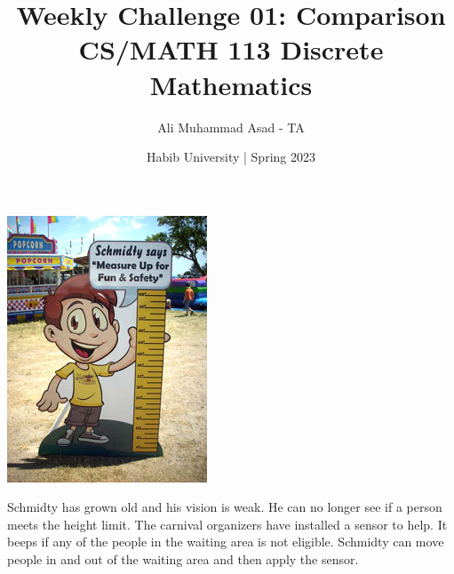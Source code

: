 \documentclass[a4paper]{exam}
\title{Weekly Challenge 01: Comparison\\CS/MATH 113 Discrete Mathematics}
\author{Ali Muhammad Asad - TA}  %
\date{Habib University | Spring 2023}
\begin{document}
\maketitle

\begin{questions}
  
  \begin{minipage}{.3\linewidth}
  \centerline{\includegraphics[width=\textwidth]{height}}
\end{minipage}
  \begin{minipage}{.65\linewidth}
Schmidty \cite{schmidt} has grown old and his vision is weak. He can no longer see if a person meets the height limit. The carnival organizers have installed a sensor to help. It beeps if any of the people in the waiting area is not eligible. Schmidty can move people in and out of the waiting area and then apply the sensor.

  \begin{parts}

\end{parts}
\end{minipage}
\end{questions}
\end{document}
